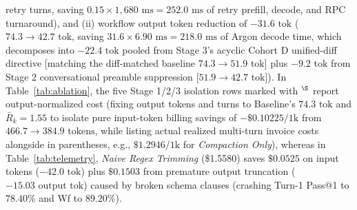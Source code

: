 \documentclass[conference,10pt]{IEEEtran}
\begin{document}
retry turns, saving $0.15 \times 1{,}680\text{ ms} = 252.0\text{ ms}$ of retry prefill, decode, and RPC turnaround), and (ii) workflow output token reduction of $-31.6\text{ tok}$ ($74.3 \to 42.7\text{ tok}$, saving $31.6 \times 6.90\text{ ms} = 218.0\text{ ms}$ of Argon decode time, which decomposes into $-22.4\text{ tok}$ pooled from Stage 3's acyclic Cohort D unified-diff directive [matching the diff-matched baseline $74.3 \to 51.9\text{ tok}$] plus $-9.2\text{ tok}$ from Stage 2 conversational preamble suppression [$51.9 \to 42.7\text{ tok}$]). In Table~\ref{tab:ablation}, the five Stage 1/2/3 isolation rows marked with $^\S$ report output-normalized cost (fixing output tokens and turns to Baseline's $74.3\text{ tok}$ and $\bar{R}_k=1.55$ to isolate pure input-token billing savings of $-\$0.10225/\text{1k}$ from $466.7 \to 384.9\text{ tokens}$, while listing actual realized multi-turn invoice costs alongside in parentheses, e.g., $\$1.2946/\text{1k}$ for \textit{Compaction Only}), whereas in Table~\ref{tab:telemetry}, \textit{Naive Regex Trimming} (\$1.5580) saves $\$0.0525$ on input tokens ($-42.0\text{ tok}$) plus $\$0.1503$ from premature output truncation ($-15.03\text{ output tok}$) caused by broken schema clauses (crashing Turn-1 Pass@1 to $78.40\%$ and Wf to $89.20\%$).
\end{document}
